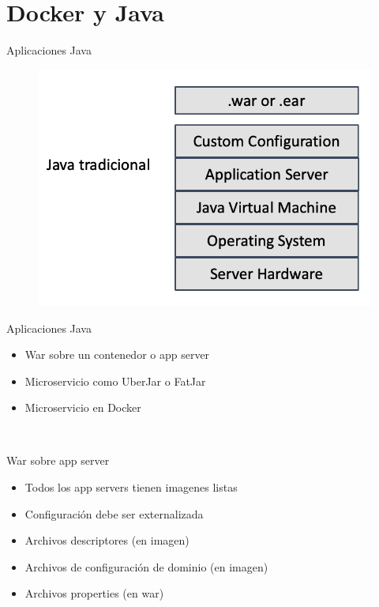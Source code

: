 \documentclass[aspectratio=169]{beamer}
\begin{document}
{
    \section{Docker y Java}
}

\begin{frame}{Aplicaciones Java}
    \begin{figure}
        \centering
        \includegraphics[width=0.5\linewidth]{Images/javatradicional}
    \end{figure}
\end{frame}

\begin{frame}{Aplicaciones Java}
    \begin{itemize}
        \item War sobre un contenedor o app server
        \item Microservicio como UberJar o FatJar
        \item Microservicio en Docker
    \end{itemize}
\end{frame} 

\begin{frame}{War sobre app server}
    \begin{itemize}
        \item Todos los app servers tienen imagenes listas
        \item Configuración debe ser externalizada
        \item Archivos descriptores (en imagen)
        \item Archivos de configuración de dominio (en imagen)
        \item Archivos properties (en war)
    \end{itemize}
\end{frame} 
\end{document}
